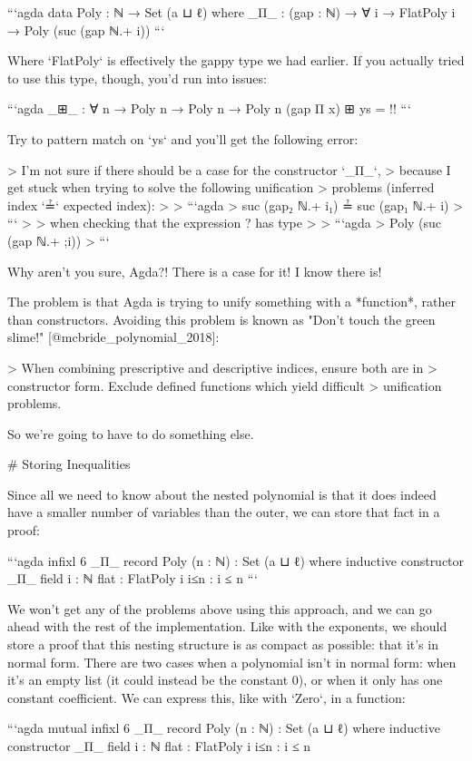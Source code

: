 \documentclass{article}
\begin{document}
```agda
data Poly : ℕ → Set (a ⊔ ℓ) where
  _Π_ : (gap : ℕ) → ∀ {i} → FlatPoly i → Poly (suc (gap ℕ.+ i))
```

Where `FlatPoly` is effectively the gappy type we had earlier. If you actually
tried to use this type, though, you'd run into issues:

```agda
_⊞_ : ∀ {n} → Poly n → Poly n → Poly n
(gap Π x) ⊞ ys = {!!}
```

Try to pattern match on `ys` and you'll get the following error:

> I'm not sure if there should be a case for the constructor `_Π_`,
> because I get stuck when trying to solve the following unification
> problems (inferred index `≟` expected index):
>
> ```agda
>   suc (gap₂ ℕ.+ i₁) ≟ suc (gap₁ ℕ.+ i)
> ```
>
> when checking that the expression ? has type
>
> ```agda
>   Poly (suc (gap ℕ.+ ;i))
> ```

Why aren't you sure, Agda?! There is a case for it! I know there is!

The problem is that Agda is trying to unify something with a *function*, rather
than constructors. Avoiding this problem is known as "Don't touch the green
slime!" [@mcbride_polynomial_2018]:

> When combining prescriptive and descriptive indices, ensure both are in
> constructor form. Exclude defined functions which yield difficult
> unification problems.

So we're going to have to do something else.

# Storing Inequalities

Since all we need to know about the nested polynomial is that it does indeed
have a smaller number of variables than the outer, we can store that fact in a
proof:

```agda
infixl 6 _Π_
record Poly (n : ℕ) : Set (a ⊔ ℓ) where
  inductive
  constructor _Π_
  field
    {i} : ℕ
    flat  : FlatPoly i
    i≤n   : i ≤ n
```

We won't get any of the problems above using this approach, and we can go ahead
with the rest of the implementation. Like with the exponents, we should store a
proof that this nesting structure is as compact as possible: that it's in normal
form. There are two cases when a polynomial isn't in normal form: when it's an
empty list (it could instead be the constant 0), or when it only has one
constant coefficient. We can express this, like with `Zero`, in a function:

```agda
mutual
  infixl 6 _Π_
  record Poly (n : ℕ) : Set (a ⊔ ℓ) where
    inductive
    constructor _Π_
    field
      {i} : ℕ
      flat  : FlatPoly i
      i≤n   : i ≤ n
\end{document}
